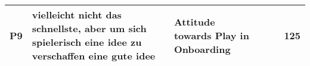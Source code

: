 \begin{appendices}
\begin{landscape}
\begin{longtable}{|p{0.8cm}|p{7cm}|p{3cm}|p{3cm}|p{5.5cm}|p{0.5cm}|}
      P9                   & vielleicht nicht das schnellste, aber um sich spielerisch eine idee zu verschaffen eine gute idee                                                                                                                                                                           & Attitude towards Play in Onboarding      &                                    &                                                                                                                                                    & 125          \\ \hline
    \end{longtable}
  \end{landscape}
\end{appendices}
